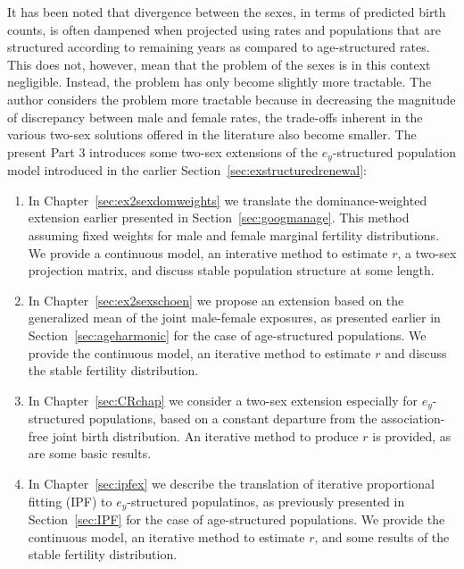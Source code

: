  \FloatBarrier
\label{Chapter:ex2sex}
It has been noted that divergence between the sexes, in terms of predicted birth
counts, is often dampened when projected using rates and populations that are
structured according to remaining years as compared to age-structured rates.
This does not, however, mean that the problem of the sexes is in this context
 negligible. Instead, the problem has
only become slightly more tractable. The author considers the problem more
tractable because in decreasing the magnitude of discrepancy between male and female
rates, the trade-offs inherent in the various two-sex solutions offered in the
literature also become smaller. The present Part 3 introduces some two-sex
extensions of the $e_y$-structured population model introduced in the earlier
Section~\ref{sec:exstructuredrenewal}:
\begin{enumerate}
  \item In Chapter~\ref{sec:ex2sexdomweights} we
  translate the dominance-weighted extension earlier presented in
  Section~\ref{sec:googmanage}. This method assuming fixed weights for male and
  female marginal fertility distributions. We provide a continuous model, an
  interative method to estimate $r$, a two-sex projection matrix, and discuss
  stable population structure at some length.
  \item In Chapter~\ref{sec:ex2sexschoen} we propose an extension based on the
  generalized mean of the joint male-female exposures, as presented earlier in
  Section~\ref{sec:ageharmonic} for the case of age-structured populations. We
  provide the continuous model, an iterative method to estimate $r$ and discuss
  the stable fertility distribution.
  \item In Chapter~\ref{sec:CRchap} we consider a two-sex extension
  especially for $e_y$-structured populations, based on a constant departure
  from the association-free joint birth distribution. An iterative method to
  produce $r$ is provided, as are some basic results.
  \item In Chapter~\ref{sec:ipfex} we describe the translation of iterative
  proportional fitting (IPF) to $e_y$-structured populatinos, as previously
  presented in Section~\ref{sec:IPF} for the case of age-structured populations.
  We provide the continuous model, an iterative method to estimate $r$, and some
  results of the stable fertility distribution.
\end{enumerate}